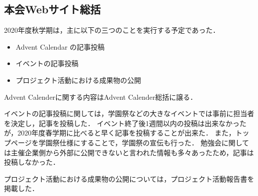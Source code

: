 \subsection*{本会Webサイト総括}


2020年度秋学期は，主に以下の三つのことを実行する予定であった．
\begin{itemize}
  \item Advent Calendar の記事投稿
  \item イベントの記事投稿
  \item プロジェクト活動における成果物の公開
\end{itemize}
Advent Calenderに関する内容はAdvent Calender総括に譲る．\n

イベントの記事投稿に関しては，学園祭などの大きなイベントでは事前に担当者を決定し，記事を投稿した．
イベント終了後1週間以内の投稿は出来なかったが，2020年度春学期に比べると早く記事を投稿することが出来た．
また，トップページを学園祭仕様にすることで，学園祭の宣伝も行った．
勉強会に関しては主催企業側から外部に公開できないと言われた情報も多々あったため，記事は投稿しなかった．\n

プロジェクト活動における成果物の公開については，プロジェクト活動報告書を掲載した．
